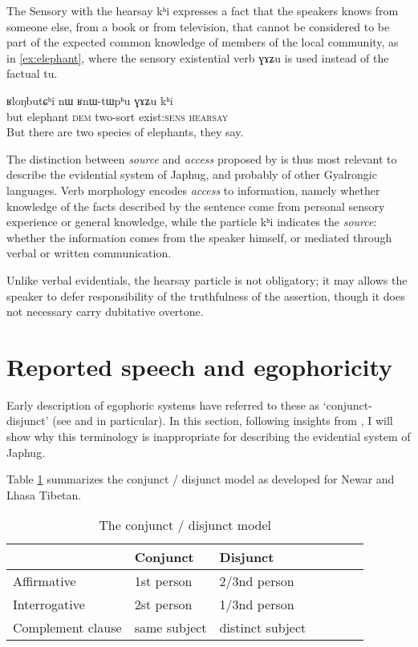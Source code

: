 \documentclass[oldfontcommands,oneside,a4paper,11pt]{article}
\newcommand{\ipa}[1]{{\phon \mbox{#1}}} %
\begin{document}
  The Sensory with the hearsay \ipa{kʰi} expresses a fact that the speakers knows from someone else, from  a book or from television, that cannot be considered to be part of the expected common knowledge of members of the local community, as in \ref{ex:elephant}, where the sensory existential verb \ipa{ɣɤʑu} is used instead of the factual \ipa{tu}.
  
   \begin{exe}
\ex \label{ex:elephant}
\gll   \ipa{tɕeri}  	\ipa{ʁloŋbutɕʰi}  	\ipa{nɯ}  	\ipa{ʁnɯ-tɯpʰu}  	\ipa{ɣɤʑu}  	\ipa{kʰi}  \\
  but elephant \textsc{dem} two-sort exist:\textsc{sens} \textsc{hearsay} \\
\glt But there are two species of elephants, they say.
\end{exe} 

The distinction between \textit{source} and \textit{access}  proposed by \citet{tournadre14evidentiality} is thus most relevant to describe the evidential system of Japhug, and probably of other Gyalrongic languages. Verb morphology encodes \textit{access} to information, namely whether knowledge of the facts described by the sentence come from personal sensory experience or general knowledge, while the particle \ipa{kʰi} indicates the \textit{source}: whether the information comes from the speaker himself, or mediated through verbal or written communication.

Unlike verbal evidentials, the hearsay particle is not obligatory; it may allows the speaker to defer responsibility of the truthfulness of the assertion,  though it does not necessary carry dubitative overtone.

\section{Reported speech and egophoricity}  
Early description of egophoric systems have referred to these as `conjunct-disjunct'  (see \citet{hale80conjunct} and \citet{delancey90erg} in particular). In this section, following insights from   \citet{tournadre08conjunct}, I will show why this terminology is inappropriate for describing the evidential system of Japhug.

 Table \ref{tab:conjunct} summarizes the conjunct / disjunct model as developed for Newar and Lhasa Tibetan. 

\begin{table}[H]
\caption{The conjunct / disjunct model} \label{tab:conjunct} \centering
\begin{tabular}{lllllll}
\toprule
& Conjunct & Disjunct \\
\midrule
Affirmative & 1st person & 2/3nd person \\
Interrogative & 2st person & 1/3nd person \\
Complement clause & same subject & distinct subject \\
\bottomrule
\end{tabular}
\end{table}
  
\end{document}
